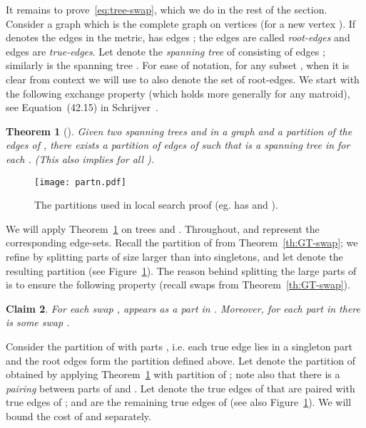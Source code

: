 \documentclass[11pt,twoside,a4paper]{article}
\newtheorem{theorem}{Theorem}
\newtheorem{claim}[theorem]{Claim}
\begin{document}
It remains to prove~\eqref{eq:tree-swap}, which we do in the rest of the section. Consider a graph  which is the
complete graph on vertices  (for a new vertex ). If  denotes the edges in the metric,
 has edges ; the edges  are called {\em root-edges} and edges
 are {\em true-edges}. Let  denote the {\em spanning tree} of  consisting of edges ; similarly  is the spanning tree . For ease of notation, for
any subset , when it is clear from context we will use  to also denote the set  of
root-edges. We start with the following exchange property (which holds more generally for any matroid), see
Equation~(42.15) in Schrijver~\cite{Schr-book}.
\begin{theorem}[\cite{Schr-book}]\label{th:mat-exch}
Given two spanning trees  and  in a graph  and a partition  of the edges of ,
there exists a partition  of edges of  such that  is a
spanning tree in  for each . (This also implies  for all ).
\end{theorem}


\begin{figure}
\begin{center}
\texttt{[image: partn.pdf]}
\caption{The partitions used in local search proof (eg. has  and ).\label{fig:partn}}
\end{center}
\end{figure}


We will apply Theorem~\ref{th:mat-exch} on trees  and . Throughout,  and  represent the corresponding
edge-sets. Recall the partition  of  from Theorem~\ref{th:GT-swap}; we refine
 by splitting parts of size larger than  into singletons, and let  denote the resulting partition (see
Figure~\ref{fig:partn}). The reason behind splitting the large parts of  is to ensure the
following property (recall swaps \swap from Theorem~\ref{th:GT-swap}).
\begin{claim}\label{cl:fstar-partn}
For each swap ,  appears as a part in . Moreover, for each part  in  there is
some swap .
\end{claim}


Consider the partition  of  with parts , i.e. each true edge lies
in a singleton part  and the root edges form the partition  defined above. Let     denote the partition of  obtained by applying Theorem~\ref{th:mat-exch} with partition  of ; note also
that there is a {\em pairing} between parts of  and . Let  denote the true edges of  that
are paired with true edges of ; and  are the remaining true edges of  (see also
Figure~\ref{fig:partn}). We will bound the cost of  and  separately.
\end{document}
